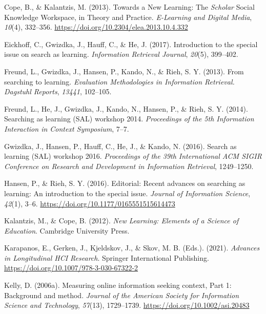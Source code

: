 \documentclass[a4paper, nobind]{templates/ociamthesis}
\newlength{\cslhangindent}
\newenvironment{CSLReferences}[2] %
 {%
  \setlength{\parindent}{0pt}
  \ifodd #1
  \let\oldpar\par
  \def\par{\hangindent=\cslhangindent\oldpar}
  \fi
  \setlength{\parskip}{1mm}
  \setlength{\baselineskip}{6mm}
 }%
 {}
\begin{document}
\begin{CSLReferences}{1}{0}
\leavevmode{}%
Cope, B., \& Kalantzis, M. (2013). Towards a {New Learning}: The {\emph{Scholar}} {Social Knowledge Workspace}, in {Theory} and {Practice}. \emph{E-Learning and Digital Media}, \emph{10}(4), 332--356. \url{https://doi.org/10.2304/elea.2013.10.4.332}

\leavevmode{}%
Eickhoff, C., Gwizdka, J., Hauff, C., \& He, J. (2017). Introduction to the special issue on search as learning. \emph{Information Retrieval Journal}, \emph{20}(5), 399--402.

\leavevmode{}%
Freund, L., Gwizdka, J., Hansen, P., Kando, N., \& Rieh, S. Y. (2013). From searching to learning. \emph{Evaluation Methodologies in Information Retrieval. Dagstuhl Reports}, \emph{13441}, 102--105.

\leavevmode{}%
Freund, L., He, J., Gwizdka, J., Kando, N., Hansen, P., \& Rieh, S. Y. (2014). Searching as learning (SAL) workshop 2014. \emph{Proceedings of the 5th Information Interaction in Context Symposium}, 7--7.

\leavevmode{}%
Gwizdka, J., Hansen, P., Hauff, C., He, J., \& Kando, N. (2016). Search as learning (SAL) workshop 2016. \emph{Proceedings of the 39th International ACM SIGIR Conference on Research and Development in Information Retrieval}, 1249--1250.

\leavevmode{}%
Hansen, P., \& Rieh, S. Y. (2016). Editorial: Recent advances on searching as learning: An introduction to the special issue. \emph{Journal of Information Science}, \emph{42}(1), 3--6. \url{https://doi.org/10.1177/0165551515614473}

\leavevmode{}%
Kalantzis, M., \& Cope, B. (2012). \emph{New {Learning}: Elements of a {Science} of {Education}}. {Cambridge University Press}.

\leavevmode{}%
Karapanos, E., Gerken, J., Kjeldskov, J., \& Skov, M. B. (Eds.). (2021). \emph{Advances in {Longitudinal HCI Research}}. {Springer International Publishing}. \url{https://doi.org/10.1007/978-3-030-67322-2}

\leavevmode{}%
Kelly, D. (2006a). Measuring online information seeking context, {Part} 1: Background and method. \emph{Journal of the American Society for Information Science and Technology}, \emph{57}(13), 1729--1739. \url{https://doi.org/10.1002/asi.20483}


\end{CSLReferences}
\end{document}
